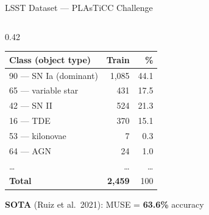 \documentclass[aspectratio=169, 10pt]{beamer}
\begin{document}
\begin{frame}{LSST Dataset — PLAsTiCC Challenge}
\begin{columns}
\begin{column}{0.42\textwidth}
\begin{center}
\begin{tabular}{lrr}
        Class (object type) & Train & \% \\
        \midrule
        90 — SN Ia (dominant) & 1,085 & 44.1 \\
        65 — variable star     &   431 & 17.5 \\
        42 — SN II             &   524 & 21.3 \\
        16 — TDE               &   370 & 15.1 \\
        \textcolor{myred}{53 — kilonovae} & \textcolor{myred}{7} & \textcolor{myred}{0.3} \\
        64 — AGN               &    24 &  1.0 \\
        \ldots                 & \ldots & \ldots \\
        \midrule
        \textbf{Total}         & \textbf{2,459} & 100 \\
        \bottomrule
      \end{tabular}
      \end{center}
      \vspace{0.4em}
      \small \textbf{SOTA} (Ruiz et al.\ 2021): MUSE = \textbf{63.6\%} accuracy
    \end{column}
  \end{columns}
\end{frame}
\end{document}
